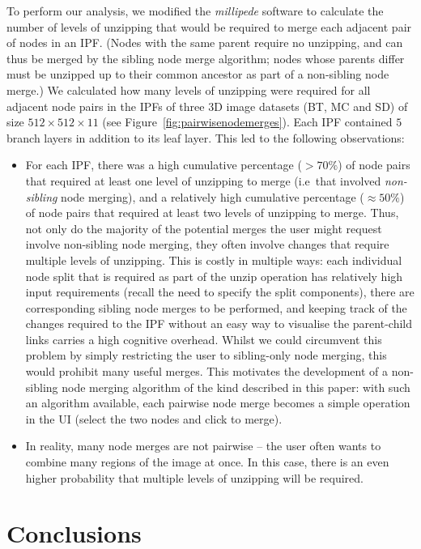 \documentclass[10pt,twocolumn,twoside]{IEEEtran}
\begin{document}
To perform our analysis, we modified the \emph{millipede} software to calculate the number of levels of unzipping that would be required to merge each adjacent pair of nodes in an IPF. (Nodes with the same parent require no unzipping, and can thus be merged by the sibling node merge algorithm; nodes whose parents differ must be unzipped up to their common ancestor as part of a non-sibling node merge.) We calculated how many levels of unzipping were required for all adjacent node pairs in the IPFs of three 3D image datasets (BT, MC and SD) of size $512 \times 512 \times 11$ (see Figure~\ref{fig:pairwisenodemerges}). Each IPF contained $5$ branch layers in addition to its leaf layer. This led to the following observations:
%
\begin{itemize}
\item For each IPF, there was a high cumulative percentage ($> 70\%$) of node pairs that required at least one level of unzipping to merge (i.e~that involved \emph{non-sibling} node merging), and a relatively high cumulative percentage ($\approx 50\%$) of node pairs that required at least two levels of unzipping to merge. Thus, not only do the majority of the potential merges the user might request involve non-sibling node merging, they often involve changes that require multiple levels of unzipping. This is costly in multiple ways: each individual node split that is required as part of the unzip operation has relatively high input requirements (recall the need to specify the split components), there are corresponding sibling node merges to be performed, and keeping track of the changes required to the IPF without an easy way to visualise the parent-child links carries a high cognitive overhead. Whilst we could circumvent this problem by simply restricting the user to sibling-only node merging, this would prohibit many useful merges. This motivates the development of a non-sibling node merging algorithm of the kind described in this paper: with such an algorithm available, each pairwise node merge becomes a simple operation in the UI (select the two nodes and click to merge).

\item In reality, many node merges are not pairwise -- the user often wants to combine many regions of the image at once. In this case, there is an even higher probability that multiple levels of unzipping will be required.
\end{itemize}
%

\section{Conclusions}
\label{sec:conclusions}
\end{document}
